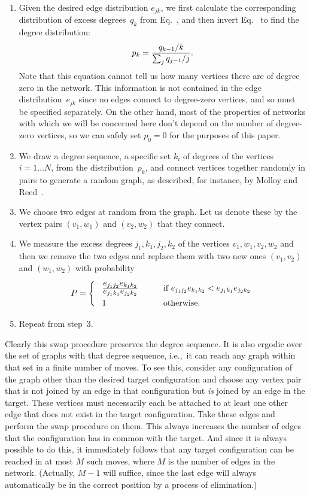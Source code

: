 \documentclass[twocolumn,pre]{revtex4}
\begin{document}
\begin{enumerate}
\item Given the desired edge distribution $e_{jk}$, we first calculate the
corresponding distribution of excess degrees~$q_k$ from
Eq.~, and then invert Eq.~ to find the degree
distribution:
\begin{equation}
p_k = {q_{k-1}/k\over\sum_j q_{j-1}/j}.
\end{equation}
Note that this equation cannot tell us how many vertices there are of
degree zero in the network.  This information is not contained in the edge
distribution~$e_{jk}$ since no edges connect to degree-zero vertices, and
so must be specified separately.  On the other hand, most of the properties
of networks with which we will be concerned here don't depend on the number
of degree-zero vertices, so we can safely set $p_0=0$ for the purposes of
this paper.
\item We draw a degree sequence, a specific set $k_i$ of degrees of the
vertices $i=1\ldots N$, from the distribution~$p_k$, and connect vertices
together randomly in pairs to generate a random graph, as described, for
instance, by Molloy and Reed~\cite{MR95}.
\item We choose two edges at random from the graph.  Let us denote these by
the vertex pairs $(v_1,w_1)$ and $(v_2,w_2)$ that they connect.
\item We measure the excess degrees $j_1,k_1,j_2,k_2$ of the vertices
$v_1,w_1,v_2,w_2$ and then we remove the two edges and replace them with
two new ones $(v_1,v_2)$ and $(w_1,w_2)$ with probability
\begin{equation}
P = \Biggl\lbrace\begin{array}{ll}
      \phantom{\bigg|}{\displaystyle e_{j_1j_2} e_{k_1k_2}\over
                      \displaystyle e_{j_1k_1} e_{j_2k_2}} &
      \qquad\mbox{if $e_{j_1j_2} e_{k_1k_2}<e_{j_1k_1} e_{j_2k_2}$} \\
      \phantom{\big|}1 & \qquad\mbox{otherwise.}
    \end{array}
\label{acceptance}
\end{equation}
\item Repeat from step~3.
\end{enumerate}
Clearly this swap procedure preserves the degree sequence.  It is also
ergodic over the set of graphs with that degree sequence, i.e.,~it can
reach any graph within that set in a finite number of moves.  To see this,
consider any configuration of the graph other than the desired target
configuration and choose any vertex pair that is not joined by an edge in
that configuration but \emph{is} joined by an edge in the target.  These
vertices must necessarily each be attached to at least one other edge that
does not exist in the target configuration.  Take these edges and perform
the swap procedure on them.  This always increases the number of edges that
the configuration has in common with the target.  And since it is always
possible to do this, it immediately follows that any target configuration
can be reached in at most $M$ such moves, where $M$ is the number of edges
in the network.  (Actually, $M-1$ will suffice, since the last edge will
always automatically be in the correct position by a process of
elimination.)
\end{document}
